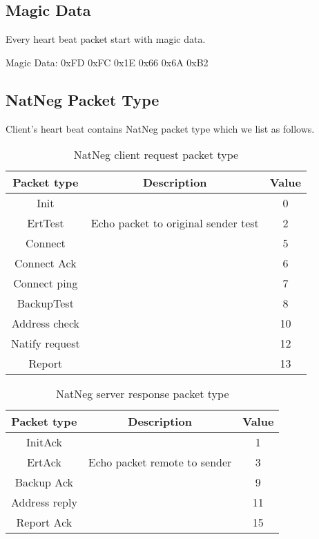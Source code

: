 \documentclass[oneside,titlepage,a4paper]{Definition/retrospy} %
\begin{document}
\subsection{Magic Data}
Every heart beat packet start with magic data.
\begin{mybox}
	Magic Data: 0xFD 0xFC 0x1E 0x66 0x6A 0xB2
\end{mybox}

\subsection{NatNeg Packet Type}
Client's heart beat contains NatNeg packet type which we list as follows.

\begin{table}[H]
	\centering
	\begin{tabular}{|c|c|c|}
		\hline
		\textbf{Packet type} &\textbf{Description}&\textbf{Value}\\\hline
		Init && 0\\\hline
		ErtTest&Echo packet to original sender test&2\\\hline
		Connect&&5\\\hline
		Connect Ack&&6\\\hline
		Connect ping&& 7\\\hline
		BackupTest&&8\\\hline
		Address check&& 10\\\hline
		Natify request&&12\\\hline
		Report && 13\\\hline
	\end{tabular}
	\caption{NatNeg client request packet type}
	\label{NatNeg client request packet type}
\end{table}


\begin{table}[H]
	\centering
	\begin{tabular}{|c|c|c|}
		\hline
		\textbf{Packet type} &\textbf{Description}&\textbf{Value}\\\hline
		InitAck&&1\\\hline
		ErtAck&Echo packet remote to sender&3\\\hline
		Backup Ack&&9\\\hline
		Address reply&&11\\\hline
		Report Ack&&15\\\hline
	\end{tabular}
	\caption{NatNeg server response packet type}
	\label{NatNeg server response packet type}
\end{table}
\end{document}
